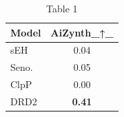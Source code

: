 \begin{table}[t]
\centering
\caption{Table 1}
\label{tab:2406.08506}
\begin{tabular}{lc}
\toprule
Model & AiZynth\_↑\_ \\
\midrule
sEH & 0.04 \\
Seno. & 0.05 \\
ClpP & 0.00 \\
DRD2 & \textbf{0.41} \\
\bottomrule
\end{tabular}
\end{table}
